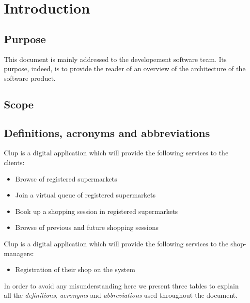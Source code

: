\section{Introduction}
\label{sect:introduction}

\subsection{Purpose}
\label{subsect:purpose}
This document is mainly addressed to the developement software team. 
Its purpose, indeed, is to provide the reader of an overview of the architecture of the software product.

\subsection{Scope}
\label{subsect:scope}


\subsection{Definitions, acronyms and abbreviations}
\label{subsect:definitionsacronymsabbreviations}
Clup is a digital application which will provide the following services to the clients:
\begin{itemize}
    \item Browse of registered supermarkets
    \item Join a virtual queue of registered supermarkets 
    \item Book up a shopping session in registered supermarkets 
    \item Browse of previous and future shopping sessions 
\end{itemize}
Clup is a digital application which will provide the following services to the shop-managers:
\begin{itemize}
    \item Registration of their shop on the system
\end{itemize}

In order to avoid any misunderstanding here we present three tables to explain all the \textit{definitions}, \textit{acronyms} and \textit{abbreviations} used throughout the document.

